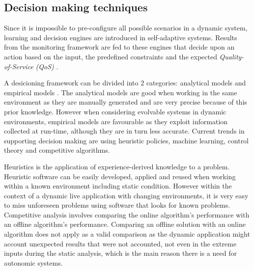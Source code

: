 \subsection{Decision making techniques}
\label{sec:decisions}
%
Since it is impossible to pre-configure all possible scenarios in a dynamic system, learning and decision engines are introduced in self-adaptive systems. Results from the monitoring framework are fed to these engines that decide upon an action based on the input, the predefined constraints and the expected \emph{Quality-of-Service (QoS)} \cite{evolvable}. 

A desicioning framework can be divided into 2 categories: analytical models and empirical models \cite{evolvable}. The analytical models are good when working in the same environment as they are manually generated and are very precise because of this prior knowledge. However when considering evolvable systems in dynamic environments, empirical models are favourable as they exploit information collected at run-time, although they are in turn less accurate. Current trends in supporting decision making are using heuristic policies, machine learning, control theory and competitive algorithms. 

Heuristics is the application of experience-derived knowledge to a problem. Heuristic software can be easily developed, applied and reused when working within a known environment including static condition. However within the context of a dynamic live application with changing environments, it is very easy to miss unforeseen problems using software that looks for known problems. %
Competitive analysis involves comparing the online algorithm's performance with an offline algorithm's performance. Comparing an offline solution with an online algorithm does not apply as a valid comparison as the dynamic application might account unexpected results that were not accounted, not even in the extreme inputs during the static analysis, which is the main reason there is a need for autonomic systems. 
%
